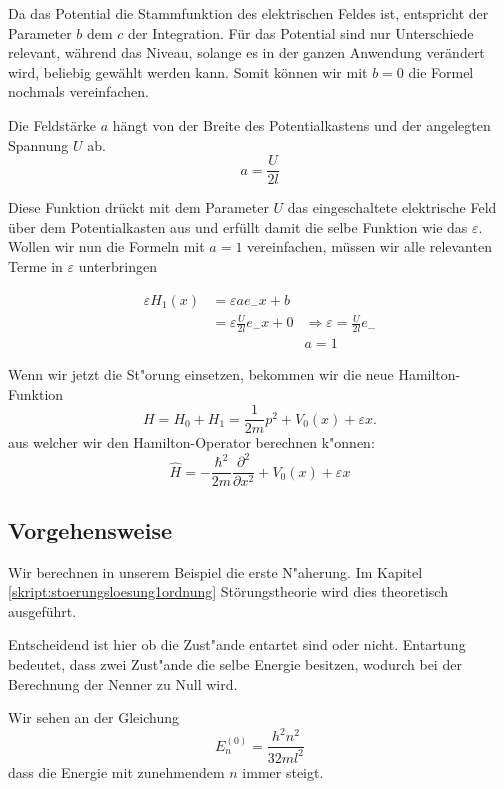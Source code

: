 \begin{refsection}
Da das Potential die Stammfunktion des elektrischen Feldes ist, entspricht der Parameter $b$ dem $c$ der Integration.
F\"ur das Potential sind nur Unterschiede relevant, w\"ahrend das Niveau, solange es in der ganzen Anwendung ver\"andert wird,
beliebig gew\"ahlt werden kann. Somit k\"onnen wir mit $b=0$ die Formel nochmals vereinfachen.

Die Feldst\"arke $a$ h\"angt von der Breite des Potentialkastens und der angelegten Spannung $U$ ab.
\[
  a = \frac{ U }{2 l}
\]

Diese Funktion dr\"uckt mit dem Parameter $U$ das eingeschaltete elektrische Feld \"uber dem Potentialkasten aus
und erf\"ullt damit die selbe Funktion wie das $\varepsilon$.
Wollen wir nun die Formeln mit $a=1$ vereinfachen, m\"ussen wir alle relevanten Terme  in $\varepsilon$ unterbringen

\begin{equation}
\begin{aligned}
  \varepsilon H_1(x) &= \varepsilon a e_{-} x +b  & \\
                     &= \varepsilon \frac{ U }{2 l} e_{-} x + 0  &\Longrightarrow \varepsilon = \frac{ U }{2 l} e_{-} \\
                     &                                           & a = 1
\end{aligned}
\end{equation} %



Wenn wir jetzt die St"orung einsetzen, bekommen wir die neue Hamilton-Funktion
\[
  H = H_0 + H_1 
    = \frac1{2m}p^2+V_0(x) + \varepsilon x.
\]
aus welcher wir den Hamilton-Operator berechnen k"onnen:
\[
  \hat{H} = -\frac{\hbar^2}{2m} \frac{\partial^2}{\partial x^2} + V_0(x) + \varepsilon x
\]

\subsection{Vorgehensweise}
Wir berechnen in unserem Beispiel die erste N"aherung.
Im Kapitel \ref{skript:stoerungsloesung1ordnung} St\"orungstheorie wird dies 
theoretisch ausgef\"uhrt.

Entscheidend ist hier ob die Zust"ande entartet sind oder nicht.
Entartung bedeutet, dass zwei Zust"ande die selbe Energie besitzen, 
wodurch bei der Berechnung der Nenner zu Null wird.

Wir sehen an der Gleichung
\[
  E_n^{(0)} = \frac{h^2n^2}{32ml^2}
\]
dass die Energie mit zunehmendem $n$ immer steigt. 


\end{refsection}
